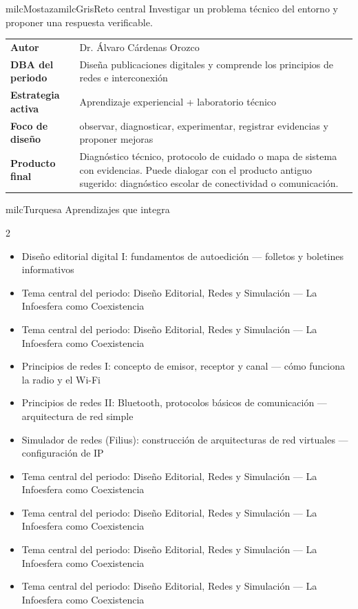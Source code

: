 \documentclass[11pt,letterpaper]{article}
\begin{document}
\begin{softbox}{milcMostaza}{milcGris}{Reto central}
Investigar un problema técnico del entorno y proponer una respuesta verificable.
\end{softbox}

\begin{tabularx}{\textwidth}{>{\bfseries}p{3.4cm}X}
\rowcolor{milcMagenta!12}Autor & Dr. Álvaro Cárdenas Orozco\\
DBA del periodo & Diseña publicaciones digitales y comprende los principios de redes e interconexión\\
Estrategia activa & Aprendizaje experiencial + laboratorio técnico\\
Foco de diseño & observar, diagnosticar, experimentar, registrar evidencias y proponer mejoras\\
Producto final & Diagnóstico técnico, protocolo de cuidado o mapa de sistema con evidencias. Puede dialogar con el producto antiguo sugerido: diagnóstico escolar de conectividad o comunicación.\\
\end{tabularx}

\begin{titlebox}{milcTurquesa}
Aprendizajes que integra
\end{titlebox}
\begin{multicols}{2}
\begin{itemize}[leftmargin=*]
\item Diseño editorial digital I: fundamentos de autoedición — folletos y boletines informativos
\item Tema central del periodo: Diseño Editorial, Redes y Simulación — La Infoesfera como Coexistencia
\item Tema central del periodo: Diseño Editorial, Redes y Simulación — La Infoesfera como Coexistencia
\item Principios de redes I: concepto de emisor, receptor y canal — cómo funciona la radio y el Wi-Fi
\item Principios de redes II: Bluetooth, protocolos básicos de comunicación — arquitectura de red simple
\item Simulador de redes (Filius): construcción de arquitecturas de red virtuales — configuración de IP
\item Tema central del periodo: Diseño Editorial, Redes y Simulación — La Infoesfera como Coexistencia
\item Tema central del periodo: Diseño Editorial, Redes y Simulación — La Infoesfera como Coexistencia
\item Tema central del periodo: Diseño Editorial, Redes y Simulación — La Infoesfera como Coexistencia
\item Tema central del periodo: Diseño Editorial, Redes y Simulación — La Infoesfera como Coexistencia
\end{itemize}
\end{multicols}
\end{document}
